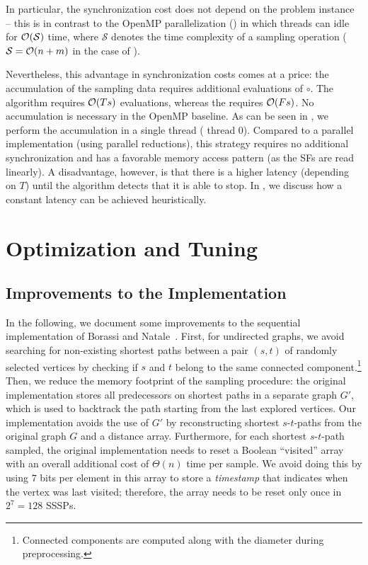 In particular, the synchronization cost does not depend on the
problem instance -- this is in contrast to the OpenMP
parallelization () in which
threads can idle for $\mathcal{O}(\mathcal{S})$ time, where
$\mathcal{S}$ denotes the time complexity of a sampling
operation (\eg $\mathcal{S} = \mathcal{O}(n + m)$ in the case of
\kadabra).

Nevertheless, this advantage in synchronization costs
comes at a price: the accumulation of the sampling
data requires additional evaluations of $\circ$.
The \localframe algorithm requires $\mathcal{O}(Ts)$ evaluations,
whereas the \sharedframe requires $\mathcal{O}(Fs)$.
%
No accumulation is necessary in the OpenMP baseline.
As can be seen in ,
we perform the accumulation in a single thread (\ie
thread 0).
Compared to a parallel implementation (\eg using
parallel reductions), this strategy requires no additional
synchronization and has a favorable memory access pattern
(as the SFs are read linearly). A disadvantage, however,
is that there is a higher latency (depending on $T$) until
the algorithm detects that it is able to stop.
In ,
we discuss how a constant latency can be achieved
heuristically.

\section{Optimization and Tuning}
%
\subsection{Improvements to the \kadabra Implementation}
\label{sec:betw-apx:kad-improvements}
%
In the following, we document some improvements to the sequential \kadabra
implementation of Borassi and Natale~\cite{DBLP:conf/esa/BorassiN16}.
First, for undirected graphs, we avoid searching for non-existing
shortest paths between a pair $(s, t)$ of randomly selected
vertices by checking if $s$ and $t$ belong to the same connected
component.\footnote{Connected components are computed along with
the diameter during preprocessing.}
%
Then, we reduce the memory footprint of the sampling procedure:
the original \kadabra implementation stores all predecessors
on shortest paths in a separate graph $G'$, which is used to
backtrack the path starting from the last explored vertices.
Our implementation avoids the use of $G'$ by reconstructing
shortest $s$-$t$-paths from the original graph $G$ and a
distance array.
%
Furthermore, for each shortest $s$-$t$-path sampled, the
original \kadabra implementation needs to reset a Boolean
\enquote{visited} array with an overall additional cost
of $\Theta(n)$ time per sample.
We avoid doing this by using $7$ bits per element in this
array to store a \emph{timestamp} that indicates when the
vertex was last visited; therefore, the array needs to be
reset only once in $2^7 = 128$ SSSPs.

